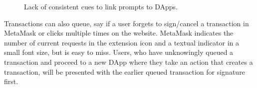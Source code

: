 \documentclass[conference]{IEEEtran}
\begin{document}
\begin{figure}[tb]
\centering
{}
\hfill
{}
\caption{Lack of consistent cues to link prompts to DApps.}
\end{figure}

Transactions can also queue, say if a user forgets to sign/cancel a transaction in MetaMask or clicks multiple times on the website. MetaMask indicates the number of current requests in the extension icon and a textual indicator in a small font size, but is easy to miss. Users, who have unknowingly queued a transaction and proceed to a new DApp where they take an action that creates a transaction, will be presented with the earlier queued transaction for signature first. 
\end{document}

